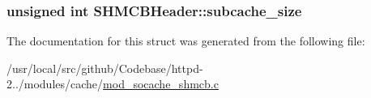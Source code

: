 \subsubsection[{\texorpdfstring{subcache\+\_\+size}{subcache_size}}]{\setlength{\rightskip}{0pt plus 5cm}unsigned {\bf int} S\+H\+M\+C\+B\+Header\+::subcache\+\_\+size}\hypertarget{structSHMCBHeader_a8718c2d5613f4e4991f414a3cb4e0583}{}\label{structSHMCBHeader_a8718c2d5613f4e4991f414a3cb4e0583}


The documentation for this struct was generated from the following file\+:\begin{DoxyCompactItemize}
\item 
/usr/local/src/github/\+Codebase/httpd-\/2../modules/cache/\hyperlink{mod__socache__shmcb_8c}{mod\+\_\+socache\+\_\+shmcb.\+c}\end{DoxyCompactItemize}
